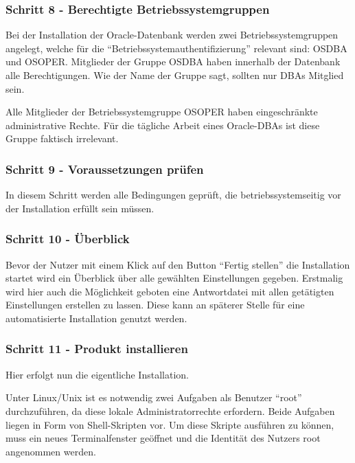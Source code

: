         \subsubsection{Schritt 8 - Berechtigte Betriebssystemgruppen}
          Bei der Installation der Oracle-Datenbank werden zwei Betriebssystemgruppen angelegt, welche für die \enquote{Betriebssystemauthentifizierung} relevant sind: OSDBA und OSOPER. Mitglieder der Gruppe OSDBA haben innerhalb der Datenbank alle Berechtigungen. Wie der Name der Gruppe sagt, sollten nur DBAs Mitglied sein.

          Alle Mitglieder der Betriebssystemgruppe OSOPER haben eingeschränkte administrative Rechte. Für die tägliche Arbeit eines Oracle-DBAs ist diese Gruppe faktisch irrelevant.
\clearpage
        \subsubsection{Schritt 9 - Voraussetzungen prüfen}
          In diesem Schritt werden alle Bedingungen geprüft, die betriebssystemseitig vor der Installation erfüllt sein müssen.
        \subsubsection{Schritt 10 - Überblick}
          Bevor der Nutzer mit einem Klick auf den Button \enquote{Fertig stellen} die Installation startet wird ein Überblick über alle gewählten Einstellungen gegeben. Erstmalig wird hier auch die Möglichkeit geboten eine Antwortdatei mit allen getätigten Einstellungen erstellen zu lassen. Diese kann an späterer Stelle für eine automatisierte Installation genutzt werden.
        \subsubsection{Schritt 11 - Produkt installieren}
          Hier erfolgt nun die eigentliche Installation.

          Unter Linux/Unix ist es notwendig zwei Aufgaben als Benutzer \enquote{root} durchzuführen, da diese lokale Administratorrechte erfordern. Beide Aufgaben liegen in Form von Shell-Skripten vor. Um diese Skripte ausführen zu können, muss ein neues Terminalfenster geöffnet und die Identität des Nutzers root angenommen werden.

